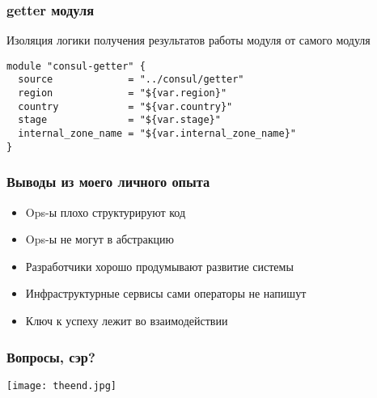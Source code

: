 \documentclass[mathserif,serif]{beamer}
\begin{document}
\begin{frame}[fragile]
	\frametitle{getter модуля}
	Изоляция логики получения результатов работы модуля от самого модуля
	\begin{verbatim}
module "consul-getter" {
  source             = "../consul/getter"
  region             = "${var.region}"
  country            = "${var.country}"
  stage              = "${var.stage}"
  internal_zone_name = "${var.internal_zone_name}"
}
	\end{verbatim}
\end{frame}

\begin{frame}
	\frametitle{Выводы из моего личного опыта}
	\begin{itemize}
		\item{Ops-ы плохо структурируют код}
		\item{Ops-ы не могут в абстракцию}
		\item{Разработчики хорошо продумывают развитие системы}
		\item{Инфраструктурные сервисы сами операторы не напишут}
		\item{Ключ к успеху лежит во взаимодействии}
	\end{itemize}
\end{frame}

\begin{frame}
	\frametitle{Вопросы, сэр?}
	\texttt{[image: theend.jpg]}
\end{frame}
\end{document}
